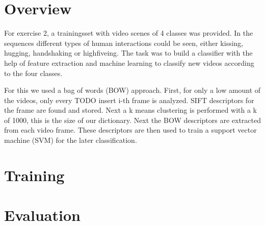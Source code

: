 \documentclass[]{scrartcl}
\begin{document}
\maketitle

\section{Overview}
For exercise 2, a trainingsset with video scenes of 4 classes was provided. In the sequences different types of human interactions could be seen, either kissing, hugging, handshaking or highfiveing. The task was to build a classifier with the help of feature extraction and machine learning to classify new videos according to the four classes.
\par For this we used a bag of words (BOW) approach. First, for only a low amount of the videos, only  every TODO insert i-th frame is analyzed. SIFT descriptors for the frame are found and stored. Next a k means clustering is performed with a k of 1000, this is the size of our dictionary. Next the BOW descriptors are extracted from each video frame. These descriptors are then used to train a support vector machine (SVM) for the later classification.

\section{Training}


\section{Evaluation}


\textbf{}
\end{document}
